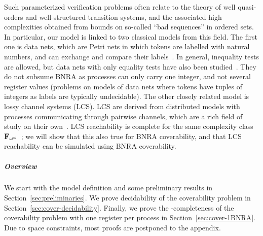 Such parameterized verification problems often relate to the theory of well quasi-orders and well-structured transition systems, and the associated high complexities obtained from bounds on so-called ``bad sequences'' in ordered sets. In particular, our model is linked to two classical models from this field. The first one is data nets, which are Petri nets in which tokens are labelled with natural numbers, and can exchange and compare their labels~\cite{LazicNORW08}. In general, inequality tests are allowed, but data nets with only equality tests have also been studied~\cite{Rosa-Velardo17}. They do not subsume BNRA as processes can only carry one integer, and not several register values (problems on models of data nets where tokens have tuples of integers as labels are typically undecidable).
The other closely related model is lossy channel systems (LCS)\cite{AbdullaJ1996verif}. LCS are derived from distributed models with processes communicating through pairwise channels, which are a rich field of study on their own~\cite{Aiswarya2015model,Aiswarya2020networks}. LCS reachability is complete for the same complexity class $\mathbf{F}_{\omega^\omega}$~\cite{ChambartS08ordinal, Schnoebelen2002verifying}; we will show that this also true for BNRA coverability, and that LCS reachability can be simulated using BNRA coverability.

\subparagraph*{Overview}
We start with the model definition and some preliminary results in Section~\ref{sec:preliminaries}. We prove decidability of the coverability problem in Section~\ref{sec:cover-decidability}. 
Finally, we prove the \NP-completeness of the coverability problem with one register per process in Section~\ref{sec:cover-1BNRA}.
Due to space constraints, most proofs are postponed to the appendix.

